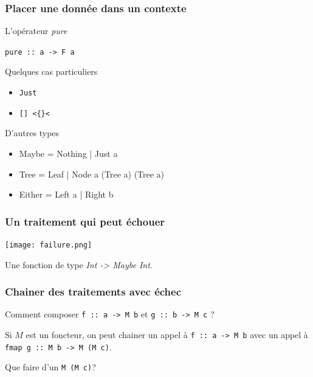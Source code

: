 \documentclass{beamer}
\begin{document}
\begin{frame}
\frametitle{Placer une donnée dans un contexte}

\begin{block}{L'opérateur \emph{pure}}
\begin{center}
\verb!pure :: a -> F a!
\end{center}
\end{block}

\begin{exampleblock}{Quelques cas particuliers}
	\begin{itemize}
		\item \verb!Just!
		\item \verb![] <{}<!
	\end{itemize}
\end{exampleblock}
\begin{block}{D'autres types}
	\begin{itemize}
		\item Maybe =  Nothing | Just a
		\item Tree = Leaf | Node a (Tree a) (Tree a)
		\item Either = Left a | Right b
	\end{itemize}
\end{block}
\end{frame}


\begin{frame}
\frametitle{Un traitement qui peut échouer}

\begin{center}
\texttt{[image: failure.png]}
\end{center}
\begin{exampleblock}{}
Une fonction de type \emph{Int -> Maybe Int}.
\end{exampleblock}
\end{frame}

\begin{frame}
\frametitle{Chainer des traitements avec échec}
\begin{block}{}
Comment composer \verb!f :: a -> M b! et \verb!g :: b -> M c! ?
\end{block}
\pause
\begin{block}{}
Si $M$ est un foncteur, on peut chainer un appel à
\verb!f :: a -> M b! avec un appel à \verb!fmap g :: M b -> M (M c)!.
\end{block}
\pause
\begin{block}{}
Que faire d'un \verb!M (M c)!?
\end{block}

\end{frame}
\end{document}
